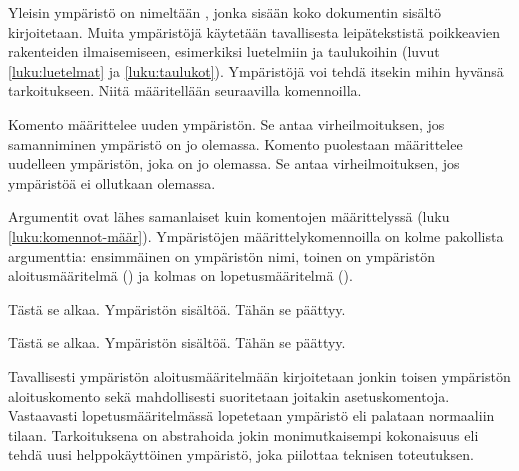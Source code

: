 \begin{koodilohkosis}
  \begin{nimi}
  \end{nimi}
\end{koodilohkosis}

Yleisin ympäristö on nimeltään , jonka sisään koko
dokumentin sisältö kirjoitetaan. Muita ympäristöjä käytetään
tavallisesta leipätekstistä poikkeavien rakenteiden ilmaisemiseen,
esimerkiksi luetelmiin ja taulukoihin (luvut \ref{luku:luetelmat} ja
\ref{luku:taulukot}). Ympäristöjä voi tehdä itsekin mihin hyvänsä
tarkoitukseen. Niitä määritellään seuraavilla komennoilla.

\begin{koodilohkosis}
  \newenvironment   {nimi}[n][oletus]{aloitus}{lopetus}
  \renewenvironment {nimi}[n][oletus]{aloitus}{lopetus}
\end{koodilohkosis}

Komento  määrittelee uuden ympäristön. Se
antaa virheilmoituksen, jos samanniminen ympäristö on jo olemassa.
Komento  puolestaan määrittelee uudelleen
ympäristön, joka on jo olemassa. Se antaa virheilmoituksen, jos
ympäristöä ei ollutkaan olemassa.

Argumentit ovat lähes samanlaiset kuin komentojen määrittelyssä (luku
\ref{luku:komennot-määr}). Ympäristöjen määrittelykomennoilla on kolme
pakollista argumenttia: ensimmäinen on ympäristön nimi, toinen on
ympäristön aloitusmääritelmä () ja kolmas on
lopetusmääritelmä ().

\pagebreak[3]

\begin{koodilohkosis}
  \newenvironment{ymp}{Tästä se alkaa.}{Tähän se päättyy.}

  \begin{ymp}
    Ympäristön sisältöä.
  \end{ymp}
\end{koodilohkosis}

\begin{tulossis}
  Tästä se alkaa. Ympäristön sisältöä. Tähän se päättyy.
\end{tulossis}

Tavallisesti ympäristön aloitusmääritelmään kirjoitetaan jonkin toisen
ympäristön aloituskomento sekä mahdollisesti suoritetaan joitakin
asetuskomentoja. Vastaavasti lopetusmääritelmässä lopetetaan ympäristö
eli palataan normaaliin tilaan. Tarkoituksena on abstrahoida jokin
monimutkaisempi kokonaisuus eli tehdä uusi helppokäyttöinen ympäristö, joka
piilottaa teknisen toteutuksen.

